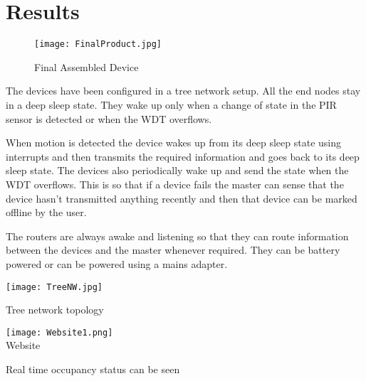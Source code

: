 \chapter{Results}

\begin{figure}[ht]
	\begin{center}
		
		\texttt{[image: FinalProduct.jpg]}
		
		\caption{Final Assembled Device}
		
		\end{center}
\end{figure}

The devices have been configured in a tree network setup. All the end nodes stay in a deep sleep state. They wake up only when a change of state in the PIR sensor is detected or when the WDT overflows. 

When motion is detected the device wakes up from its deep sleep state using interrupts and then transmits the required information and goes back to its deep sleep state. 
The devices also periodically wake up and send the state when the WDT overflows. This is so that if a device fails the master can sense that the device hasn't transmitted anything recently and then that device can be marked offline by the user.

The routers are always awake and listening so that they can route information between the devices and the master whenever required. They can be battery powered or can be powered using a mains adapter.

\begin{center}
	\texttt{[image: TreeNW.jpg]}
	
	Tree network topology
\end{center}

\begin{center}
	\texttt{[image: Website1.png]}
	\\Website
\end{center}

Real time occupancy status can be seen 


